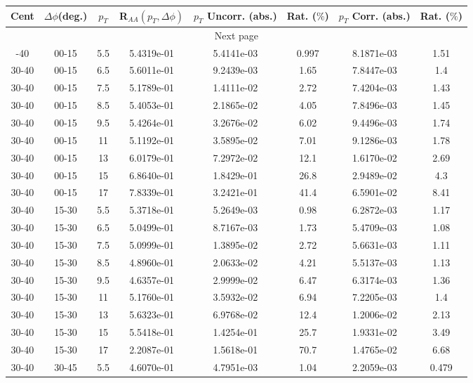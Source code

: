             
\begin{longtable}{|cccccccc|}
\hline
Cent & $\Delta\phi$(deg.) & $p_{T}$ & R$_{AA}(p_{T},\Delta\phi)$ & $p_{T}$ Uncorr. (abs.) & Rat. ($\%$) & $p_{T}$ Corr. (abs.) & Rat. ($\%$)  \\
\hline
\endhead
\hline \multicolumn{8}{|c|}{{Next page}} \\
\hline
\endfoot
\endlastfoot
\hline
30-40 & 00-15 & 5.5 & 5.4319e-01 & 5.4141e-03 & 0.997 & 8.1871e-03 & 1.51 \\ 
30-40 & 00-15 & 6.5 & 5.6011e-01 & 9.2439e-03 & 1.65 & 7.8447e-03 & 1.4 \\ 
30-40 & 00-15 & 7.5 & 5.1789e-01 & 1.4111e-02 & 2.72 & 7.4204e-03 & 1.43 \\ 
30-40 & 00-15 & 8.5 & 5.4053e-01 & 2.1865e-02 & 4.05 & 7.8496e-03 & 1.45 \\ 
30-40 & 00-15 & 9.5 & 5.4264e-01 & 3.2676e-02 & 6.02 & 9.4496e-03 & 1.74 \\ 
30-40 & 00-15 & 11 & 5.1192e-01 & 3.5895e-02 & 7.01 & 9.1286e-03 & 1.78 \\ 
30-40 & 00-15 & 13 & 6.0179e-01 & 7.2972e-02 & 12.1 & 1.6170e-02 & 2.69 \\ 
30-40 & 00-15 & 15 & 6.8640e-01 & 1.8429e-01 & 26.8 & 2.9489e-02 & 4.3 \\ 
30-40 & 00-15 & 17 & 7.8339e-01 & 3.2421e-01 & 41.4 & 6.5901e-02 & 8.41 \\ 
\hline
30-40 & 15-30 & 5.5 & 5.3718e-01 & 5.2649e-03 & 0.98 & 6.2872e-03 & 1.17 \\ 
30-40 & 15-30 & 6.5 & 5.0499e-01 & 8.7167e-03 & 1.73 & 5.4709e-03 & 1.08 \\ 
30-40 & 15-30 & 7.5 & 5.0999e-01 & 1.3895e-02 & 2.72 & 5.6631e-03 & 1.11 \\ 
30-40 & 15-30 & 8.5 & 4.8960e-01 & 2.0633e-02 & 4.21 & 5.5137e-03 & 1.13 \\ 
30-40 & 15-30 & 9.5 & 4.6357e-01 & 2.9999e-02 & 6.47 & 6.3174e-03 & 1.36 \\ 
30-40 & 15-30 & 11 & 5.1760e-01 & 3.5932e-02 & 6.94 & 7.2205e-03 & 1.4 \\ 
30-40 & 15-30 & 13 & 5.6323e-01 & 6.9768e-02 & 12.4 & 1.2006e-02 & 2.13 \\ 
30-40 & 15-30 & 15 & 5.5418e-01 & 1.4254e-01 & 25.7 & 1.9331e-02 & 3.49 \\ 
30-40 & 15-30 & 17 & 2.2087e-01 & 1.5618e-01 & 70.7 & 1.4765e-02 & 6.68 \\ 
\hline
30-40 & 30-45 & 5.5 & 4.6070e-01 & 4.7951e-03 & 1.04 & 2.2059e-03 & 0.479 \\ 

\end{longtable}

